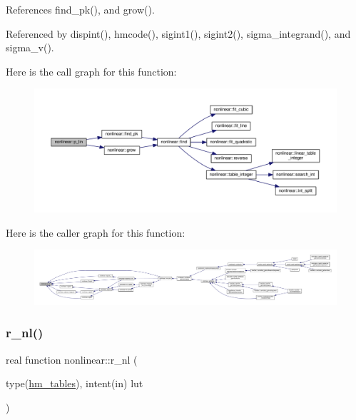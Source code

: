 References find\+\_\+pk(), and grow().



Referenced by dispint(), hmcode(), sigint1(), sigint2(), sigma\+\_\+integrand(), and sigma\+\_\+v().

Here is the call graph for this function\+:
\nopagebreak
\begin{figure}[H]
\begin{center}
\leavevmode
\includegraphics[width=350pt]{namespacenonlinear_ad2f542da0cba1686588e83dec8ac7617_cgraph}
\end{center}
\end{figure}
Here is the caller graph for this function\+:
\nopagebreak
\begin{figure}[H]
\begin{center}
\leavevmode
\includegraphics[width=350pt]{namespacenonlinear_ad2f542da0cba1686588e83dec8ac7617_icgraph}
\end{center}
\end{figure}
\mbox{\label{namespacenonlinear_a9fdd5c2093c44b1f49fdaafaa3e568da}} 
\subsubsection{\texorpdfstring{r\+\_\+nl()}{r\_nl()}}
{\footnotesize\ttfamily real function nonlinear\+::r\+\_\+nl (\begin{DoxyParamCaption}\item[{type(\mbox{\hyperlink{structnonlinear_1_1hm__tables}{hm\+\_\+tables}}), intent(in)}]{lut }\end{DoxyParamCaption})\hspace{0.3cm}{\ttfamily [private]}}



